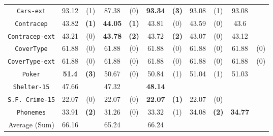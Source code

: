 \begin{table}
\begin{tabular}{c|cc|cc|cc|cc|cc}
{\tt Cars-ext}      & 93.12      &  (1)              &   87.38      & (0)             & {\bf 93.34} &  {\bf (3)}           & 93.08       & (1)            & 93.08       &             \\
{\tt Contracep}     & 43.82      &  {\bf (1)}        &   {\bf 44.05}& {\bf (1)}       &  43.81      &  (0)                 & 43.59       & (0)            & 43.6        &             \\
{\tt Contracep-ext} & 43.21      &  (0)              &   {\bf 43.78}& {\bf (2)}       &  43.72      &  {\bf (2)}           & 43.07       & (0)            & 43.12       &             \\
{\tt CoverType}     & 61.88      &  (0)              &   61.88      & (0)             &  61.88      &  (0)                 & 61.88       & (0)            & 61.88       &             (0) \\
{\tt CoverType-ext} & 61.88      &  (0)              &   61.88      & (0)             &  61.88      &  (0)                 & 61.88       & (0)            & 61.88       &             (0) \\
{\tt Poker}         & {\bf 51.4} &  {\bf (3)}        &   50.67      & (0)             &  50.84      &  (1)                 & 51.04       & (1)            & 51.03       &             \\
{\tt Shelter-15}    & 47.66      &                   &   47.32      &                 & {\bf 48.14} &                      &             &                &             &             \\
{\tt S.F. Crime-15} & 22.07      &  (0)              &   22.07      & (0)             & {\bf 22.07} &  {\bf (1)}           & 22.07       & (0)            &             &             \\
{\tt Phonemes}      & 33.91      &  {\bf (2)}        &   31.26      & (0)             &  33.32      &  (1)                 & 34.08       & {\bf (2)}      & {\bf 34.77} &             \\
\hline
Average (Sum)       & 66.16      &                   &   65.24      &                 &  66.24      &                      &             &                &             &
       \end{tabular}
\normalsize
\label{tab:ctree-16}
\end{table}


